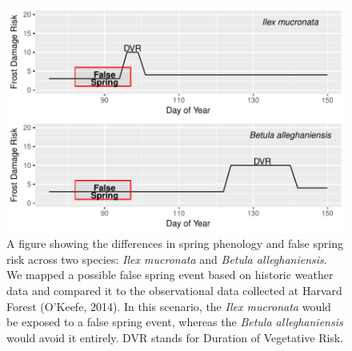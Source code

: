 \documentclass{article}\usepackage[]{graphicx}\usepackage[]{color}
\makeatletter
\def\maxwidth{ %
  \ifdim\Gin@nat@width>\linewidth
    \linewidth
  \else
    \Gin@nat@width
  \fi
}
\makeatother
\begin{document}
\begin{figure}[H]

{\centering \includegraphics[width=\maxwidth]{figure/risk-1} 

}

\caption{A figure showing the differences in spring phenology and false spring risk across two species: \textit{Ilex mucronata} and \textit{Betula alleghaniensis}. We mapped a possible false spring event based on historic weather data and compared it to the observational data collected at Harvard Forest (O'Keefe, 2014). In this scenario, the \textit{Ilex mucronata} would be exposed to a false spring event, whereas the \textit{Betula alleghaniensis} would avoid it entirely. DVR stands for Duration of Vegetative Risk.}\label{fig:risk}
\end{figure}
\end{document}
